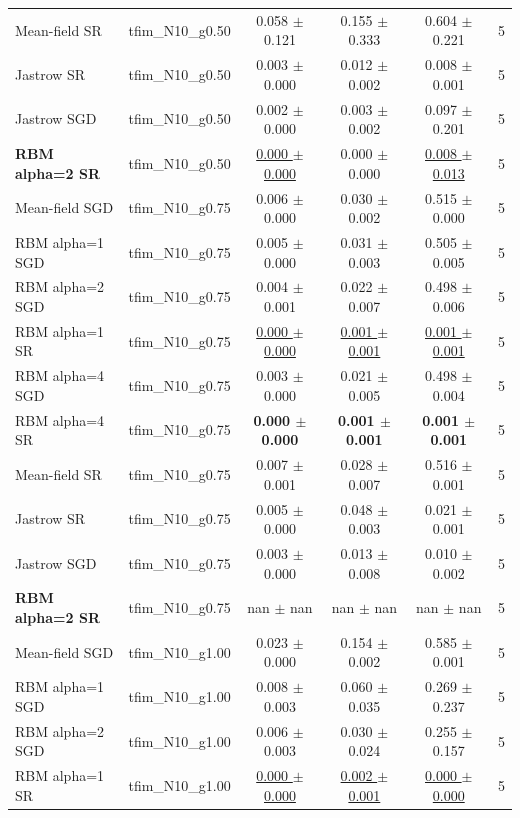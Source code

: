 \begin{tabular}{llcccc}
Mean-field SR & tfim\_N10\_g0.50 & 0.058 $\pm$ 0.121 & 0.155 $\pm$ 0.333 & 0.604 $\pm$ 0.221 & 5 \\
Jastrow SR & tfim\_N10\_g0.50 & 0.003 $\pm$ 0.000 & 0.012 $\pm$ 0.002 & 0.008 $\pm$ 0.001 & 5 \\
Jastrow SGD & tfim\_N10\_g0.50 & 0.002 $\pm$ 0.000 & 0.003 $\pm$ 0.002 & 0.097 $\pm$ 0.201 & 5 \\
\textbf{RBM alpha=2 SR} & tfim\_N10\_g0.50 & \underline{0.000 $\pm$ 0.000} & 0.000 $\pm$ 0.000 & \underline{0.008 $\pm$ 0.013} & 5 \\
\midrule
Mean-field SGD & tfim\_N10\_g0.75 & 0.006 $\pm$ 0.000 & 0.030 $\pm$ 0.002 & 0.515 $\pm$ 0.000 & 5 \\
RBM alpha=1 SGD & tfim\_N10\_g0.75 & 0.005 $\pm$ 0.000 & 0.031 $\pm$ 0.003 & 0.505 $\pm$ 0.005 & 5 \\
RBM alpha=2 SGD & tfim\_N10\_g0.75 & 0.004 $\pm$ 0.001 & 0.022 $\pm$ 0.007 & 0.498 $\pm$ 0.006 & 5 \\
RBM alpha=1 SR & tfim\_N10\_g0.75 & \underline{0.000 $\pm$ 0.000} & \underline{0.001 $\pm$ 0.001} & \underline{0.001 $\pm$ 0.001} & 5 \\
RBM alpha=4 SGD & tfim\_N10\_g0.75 & 0.003 $\pm$ 0.000 & 0.021 $\pm$ 0.005 & 0.498 $\pm$ 0.004 & 5 \\
RBM alpha=4 SR & tfim\_N10\_g0.75 & \textbf{0.000 $\pm$ 0.000} & \textbf{0.001 $\pm$ 0.001} & \textbf{0.001 $\pm$ 0.001} & 5 \\
Mean-field SR & tfim\_N10\_g0.75 & 0.007 $\pm$ 0.001 & 0.028 $\pm$ 0.007 & 0.516 $\pm$ 0.001 & 5 \\
Jastrow SR & tfim\_N10\_g0.75 & 0.005 $\pm$ 0.000 & 0.048 $\pm$ 0.003 & 0.021 $\pm$ 0.001 & 5 \\
Jastrow SGD & tfim\_N10\_g0.75 & 0.003 $\pm$ 0.000 & 0.013 $\pm$ 0.008 & 0.010 $\pm$ 0.002 & 5 \\
\textbf{RBM alpha=2 SR} & tfim\_N10\_g0.75 & nan $\pm$ nan & nan $\pm$ nan & nan $\pm$ nan & 5 \\
\midrule
Mean-field SGD & tfim\_N10\_g1.00 & 0.023 $\pm$ 0.000 & 0.154 $\pm$ 0.002 & 0.585 $\pm$ 0.001 & 5 \\
RBM alpha=1 SGD & tfim\_N10\_g1.00 & 0.008 $\pm$ 0.003 & 0.060 $\pm$ 0.035 & 0.269 $\pm$ 0.237 & 5 \\
RBM alpha=2 SGD & tfim\_N10\_g1.00 & 0.006 $\pm$ 0.003 & 0.030 $\pm$ 0.024 & 0.255 $\pm$ 0.157 & 5 \\
RBM alpha=1 SR & tfim\_N10\_g1.00 & \underline{0.000 $\pm$ 0.000} & \underline{0.002 $\pm$ 0.001} & \underline{0.000 $\pm$ 0.000} & 5 \\

\end{tabular}
